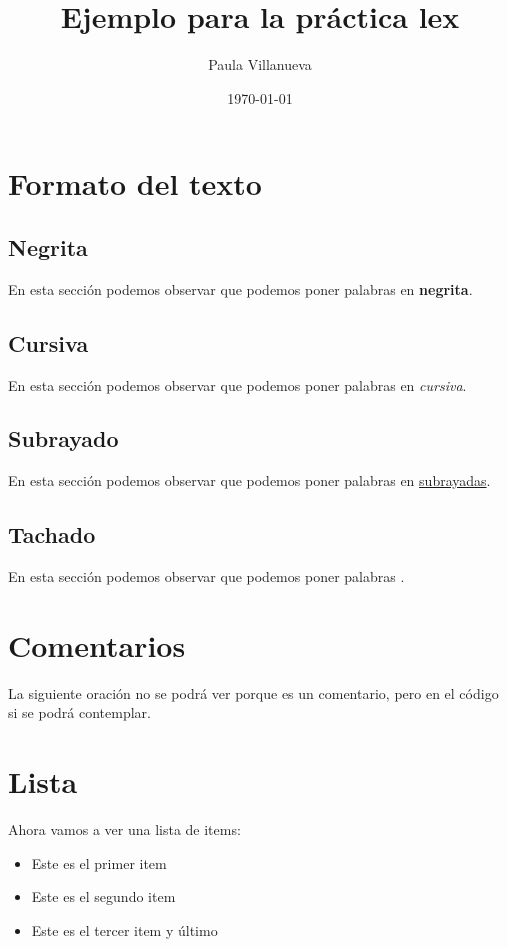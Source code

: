 \documentclass{article}
\title{Ejemplo para la práctica lex}
\author{Paula Villanueva}
\date{\today}
\begin{document}
\maketitle

\section{Formato del texto}
\subsection{Negrita}
En esta sección podemos observar que podemos poner palabras en \textbf{negrita}.

\subsection{Cursiva}
En esta sección podemos observar que podemos poner palabras en \textit{cursiva}.

\subsection{Subrayado}
En esta sección podemos observar que podemos poner palabras en \underline{subrayadas}.

\subsection{Tachado}
En esta sección podemos observar que podemos poner palabras .

\section{Comentarios}
La siguiente oración no se podrá ver porque es un comentario, pero en el código si se podrá contemplar.


\section{Lista}
Ahora vamos a ver una lista de items:

\begin{itemize}
\item Este es el primer item
\item Este es el segundo item
\item Este es el tercer item y último
\end{itemize}
\end{document}
